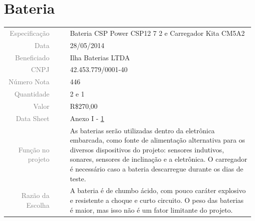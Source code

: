 




\section{Bateria}
\label{bateria}


\begin{table}[ht!]

	\begin{tabular}{r l|l p{12cm} }
		
		\textcolor{gray}{Especificação} &&& 	{Bateria CSP Power CSP12 7 2 e
		Carregador Kita CM5A2}\\
		\textcolor{gray}{Data} &&& 				{28/05/2014}\\
        \textcolor{gray}{Beneficiado} &&&		{Ilha Baterias LTDA} \\
        \textcolor{gray}{CNPJ} &&& 				{42.453.779/0001-40} \\
        \textcolor{gray}{Número Nota} &&& 		{446} \\
		\textcolor{gray}{Quantidade} &&& 		{2 e 1} \\
		\textcolor{gray}{Valor} &&& 			{R\$270,00} \\
		\textcolor{gray}{Data Sheet} &&& 		{Anexo I - \ref{bateria}} \\

		\textcolor{gray}{Função no projeto} &&& {As baterias serão utilizadas dentro
		da eletrônica embarcada, como fonte de alimentação alternativa para os
		diversos dispositivos do projeto: sensores indutivos, sonares, sensores de
		inclinação e a eletrônica. O carregador é necessário caso a bateria
		descarregue durante os dias de teste.}
		\\
		\textcolor{gray}{Razão da Escolha} &&& {A bateria é de chumbo ácido, com
		pouco caráter explosivo e resistente a choque e curto circuito. O peso das
		baterias é maior, mas isso não é um fator limitante do projeto.}

	\end{tabular}
\end{table}

\newpage

